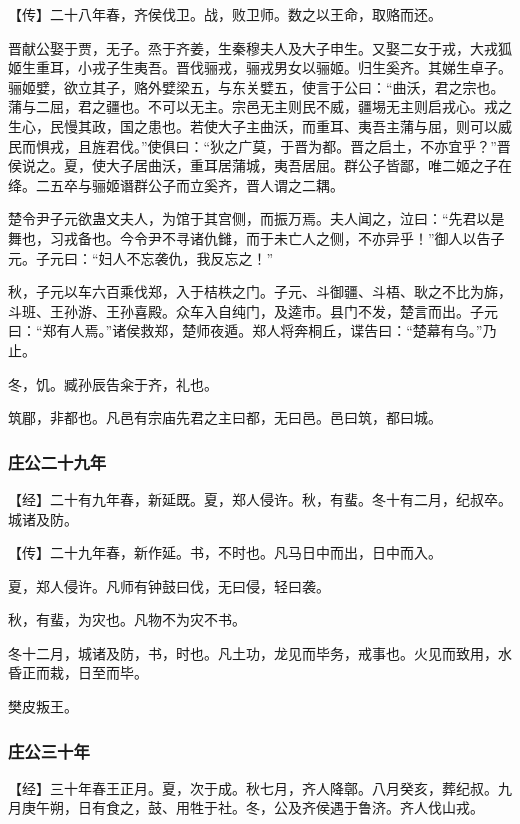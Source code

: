 \documentclass[]{article}
\begin{document}
【传】二十八年春，齐侯伐卫。战，败卫师。数之以王命，取赂而还。

晋献公娶于贾，无子。烝于齐姜，生秦穆夫人及大子申生。又娶二女于戎，大戎狐姬生重耳，小戎子生夷吾。晋伐骊戎，骊戎男女以骊姬。归生奚齐。其娣生卓子。骊姬嬖，欲立其子，赂外嬖梁五，与东关嬖五，使言于公曰：``曲沃，君之宗也。蒲与二屈，君之疆也。不可以无主。宗邑无主则民不威，疆埸无主则启戎心。戎之生心，民慢其政，国之患也。若使大子主曲沃，而重耳、夷吾主蒲与屈，则可以威民而惧戎，且旌君伐。''使俱曰：``狄之广莫，于晋为都。晋之启土，不亦宜乎？''晋侯说之。夏，使大子居曲沃，重耳居蒲城，夷吾居屈。群公子皆鄙，唯二姬之子在绛。二五卒与骊姬谮群公子而立奚齐，晋人谓之二耦。

楚令尹子元欲蛊文夫人，为馆于其宫侧，而振万焉。夫人闻之，泣曰：``先君以是舞也，习戎备也。今令尹不寻诸仇雠，而于未亡人之侧，不亦异乎！''御人以告子元。子元曰：``妇人不忘袭仇，我反忘之！''

秋，子元以车六百乘伐郑，入于桔柣之门。子元、斗御疆、斗梧、耿之不比为旆，斗班、王孙游、王孙喜殿。众车入自纯门，及逵市。县门不发，楚言而出。子元曰：``郑有人焉。''诸侯救郑，楚师夜遁。郑人将奔桐丘，谍告曰：``楚幕有乌。''乃止。

冬，饥。臧孙辰告籴于齐，礼也。

筑郿，非都也。凡邑有宗庙先君之主曰都，无曰邑。邑曰筑，都曰城。

\hypertarget{header-n577}{%
\subsubsection{庄公二十九年}\label{header-n577}}

【经】二十有九年春，新延既。夏，郑人侵许。秋，有蜚。冬十有二月，纪叔卒。城诸及防。

【传】二十九年春，新作延。书，不时也。凡马日中而出，日中而入。

夏，郑人侵许。凡师有钟鼓曰伐，无曰侵，轻曰袭。

秋，有蜚，为灾也。凡物不为灾不书。

冬十二月，城诸及防，书，时也。凡土功，龙见而毕务，戒事也。火见而致用，水昏正而栽，日至而毕。

樊皮叛王。

\hypertarget{header-n586}{%
\subsubsection{庄公三十年}\label{header-n586}}

【经】三十年春王正月。夏，次于成。秋七月，齐人降鄣。八月癸亥，葬纪叔。九月庚午朔，日有食之，鼓、用牲于社。冬，公及齐侯遇于鲁济。齐人伐山戎。
\end{document}
